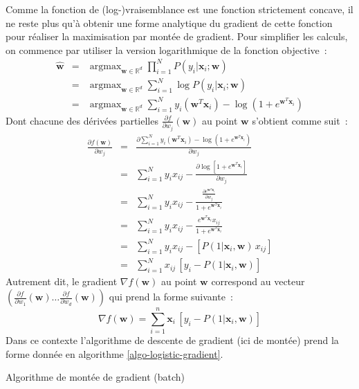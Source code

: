 \documentclass[11pt,openany]{book}
\begin{document}
Comme la fonction de (log-)vraisemblance est une fonction strictement
concave, il ne reste
plus qu'à obtenir une forme analytique du gradient de cette fonction
pour réaliser la maximisation par montée de gradient.
Pour simplifier les calculs, on commence par utiliser la version
logarithmique de la fonction objective~:
\begin{eqnarray}
\hat{\mathbf{w}} &=& \mathop{\text{argmax}}_{\mathbf{w} \in
  \mathbb{R}^d} \prod_{i=1}^N P(y_i|\mathbf{x}_i; \mathbf{w})\\
&=&\mathop{\text{argmax}}_{\mathbf{w} \in  \mathbb{R}^d} \sum_{i=1}^N
\log P(y_i|\mathbf{x}_i; \mathbf{w})\\
&=&\mathop{\text{argmax}}_{\mathbf{w} \in  \mathbb{R}^d} \sum_{i=1}^N
y_i ( \mathbf{w}^T \mathbf{x}_i )- \log ( 1+e^{\mathbf{w}^T
  \mathbf{x}_i} )
\end{eqnarray}
Dont chacune des dérivées partielles $\frac{\partial f}{\partial w_j}(\mathbf{w})$ au point $\mathbf{w}$
s'obtient comme suit~:
\begin{eqnarray}
\frac{\partial f(\mathbf{w})}{\partial w_j}&=&\frac{\partial \sum_{i=1}^N
y_i ( \mathbf{w}^T \mathbf{x}_i ) - \log ( 1+e^{\mathbf{w}^T
  \mathbf{x}_i} )}{\partial w_j}\\
&=&\sum_{i=1}^N y_i  x_{ij} - \frac{\partial \log [ 1+e^{\mathbf{w}^T
  \mathbf{x}_i} ] }{\partial w_j}\\
&=&\sum_{i=1}^N y_i  x_{ij} - 
\frac{\frac{\partial e^{\mathbf{w}^T  \mathbf{x}_i} }{\partial
    w_j}}{1+ e^{\mathbf{w}^T  \mathbf{x}_i}}\\
&=&\sum_{i=1}^N y_i  x_{ij} - 
\frac{e^{\mathbf{w}^T  \mathbf{x}_i} x_{ij}} {1+ e^{\mathbf{w}^T  \mathbf{x}_i}}\\
&=&\sum_{i=1}^N y_i  x_{ij} - [ P( 1 | \mathbf{x}_i,\mathbf{w}) \, x_{ij} ]\\
&=&\sum_{i=1}^N x_{ij} \, [ y_i  - P( 1 | \mathbf{x}_i,\mathbf{w}) ]
\end{eqnarray}
Autrement dit, le gradient $\nabla f(\mathbf{w})$ au point
$\mathbf{w}$ correspond au vecteur $(\frac{\partial f}{\partial w_1}(\mathbf{w}) \ldots
\frac{\partial f}{\partial w_d}(\mathbf{w}))$ qui prend la forme suivante~:
\begin{displaymath}
\nabla f(\mathbf{w}) = \sum_{i=1}^n  \mathbf{x}_{i} \, [ y_i  - P( 1 | \mathbf{x}_i,\mathbf{w}) ]
\end{displaymath}
Dans ce contexte l'algorithme de descente de gradient  (ici de montée)  prend la forme
donnée en algorithme \ref{algo-logistic-gradient}.
\begin{algorithm}
\caption{\label{algo-logistic-gradient}Algorithme de montée  de gradient (batch)}
\end{algorithm}
\end{document}

